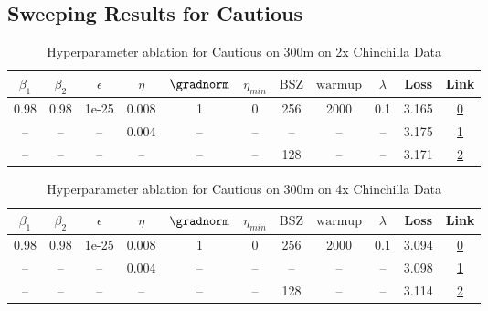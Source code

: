 \subsection{Sweeping Results for Cautious}%
\begin{table}[H]
\centering
\caption{Hyperparameter ablation for Cautious on 300m on 2x Chinchilla Data}
\label{tab:ablation_cautious_300m_on_2x_chinchilla_data}
\begin{tabular}{ccccccccccc}
\toprule
$\beta_1$ & $\beta_2$ & $\epsilon$ & $\eta$ & $\gradnorm$ & $\eta_{min}$ & $\mathrm{BSZ}$ & $\mathrm{warmup}$ & $\lambda$ & Loss & Link \\
\midrule
0.98 & 0.98 & 1e-25 & 0.008 & 1 & 0 & 256 & 2000 & 0.1 & 3.165 & \href{https://wandb.ai/stanford-mercury/optimizer-scaling/runs/sweep-300m-12B-cautious008d65lr0.008-wd0.1-minlr0-warmup2000-b10-69dcda}{0} \\
\midrule
-- & -- & -- & 0.004 & -- & -- & -- & -- & -- & 3.175 & \href{https://wandb.ai/stanford-mercury/optimizer-scaling/runs/sweep-300m-12B-cautious188cablr0.004-wd0.1-minlr0-warmup2000-b10-be1c3d}{1} \\
-- & -- & -- & -- & -- & -- & 128 & -- & -- & 3.171 & \href{https://wandb.ai/stanford-mercury/optimizer-scaling/runs/sweep-300m-12B-cautious820e4dlr0.008-wd0.1-minlr0-warmup2000-b10-fe955e}{2} \\
\bottomrule
\end{tabular}
\end{table}

\begin{table}[H]
\centering
\caption{Hyperparameter ablation for Cautious on 300m on 4x Chinchilla Data}
\label{tab:ablation_cautious_300m_on_4x_chinchilla_data}
\begin{tabular}{ccccccccccc}
\toprule
$\beta_1$ & $\beta_2$ & $\epsilon$ & $\eta$ & $\gradnorm$ & $\eta_{min}$ & $\mathrm{BSZ}$ & $\mathrm{warmup}$ & $\lambda$ & Loss & Link \\
\midrule
0.98 & 0.98 & 1e-25 & 0.008 & 1 & 0 & 256 & 2000 & 0.1 & 3.094 & \href{https://wandb.ai/stanford-mercury/optimizer-scaling/runs/sweep-300m-24B-cautious820e4dlr0.008-wd0.1-minlr0-warmup2000-b10-fe0a65}{0} \\
\midrule
-- & -- & -- & 0.004 & -- & -- & -- & -- & -- & 3.098 & \href{https://wandb.ai/stanford-mercury/optimizer-scaling/runs/sweep-300m-24B-cautious2e72c8lr0.004-wd0.1-minlr0-warmup2000-b10-13950f}{1} \\
-- & -- & -- & -- & -- & -- & 128 & -- & -- & 3.114 & \href{https://wandb.ai/stanford-mercury/optimizer-scaling/runs/sweep-300m-24B-cautious1c558clr0.008-wd0.1-minlr0-warmup2000-b10-69130a}{2} \\
\bottomrule
\end{tabular}
\end{table}


